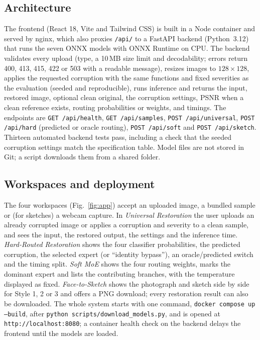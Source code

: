 \documentclass[conference]{IEEEtran}
\begin{document}
\subsection{Architecture}
The frontend (React 18, Vite and Tailwind CSS) is built in a Node container and served by nginx, which also proxies \texttt{/api/} to a FastAPI backend (Python~3.12) that runs the seven ONNX models with ONNX Runtime on CPU. The backend validates every upload (type, a 10\,MB size limit and decodability; errors return 400, 413, 415, 422 or 503 with a readable message), resizes images to $128{\times}128$, applies the requested corruption with the same functions and fixed severities as the evaluation (seeded and reproducible), runs inference and returns the input, restored image, optional clean original, the corruption settings, PSNR when a clean reference exists, routing probabilities or weights, and timings. The endpoints are \texttt{GET /api/health}, \texttt{GET /api/samples}, \texttt{POST /api/universal}, \texttt{POST /api/hard} (predicted or oracle routing), \texttt{POST /api/soft} and \texttt{POST /api/sketch}. Thirteen automated backend tests pass, including a check that the seeded corruption settings match the specification table. Model files are not stored in Git; a script downloads them from a shared folder.

\subsection{Workspaces and deployment}
The four workspaces (Fig.~\ref{fig:app}) accept an uploaded image, a bundled sample or (for sketches) a webcam capture. In \emph{Universal Restoration} the user uploads an already corrupted image or applies a corruption and severity to a clean sample, and sees the input, the restored output, the settings and the inference time. \emph{Hard-Routed Restoration} shows the four classifier probabilities, the predicted corruption, the selected expert (or ``identity bypass''), an oracle/predicted switch and the timing split. \emph{Soft MoE} shows the four routing weights, marks the dominant expert and lists the contributing branches, with the temperature displayed as fixed. \emph{Face-to-Sketch} shows the photograph and sketch side by side for Style 1, 2 or 3 and offers a PNG download; every restoration result can also be downloaded. The whole system starts with one command, \texttt{docker compose up --build}, after \texttt{python scripts/download\_models.py}, and is opened at \texttt{http://localhost:8080}; a container health check on the backend delays the frontend until the models are loaded.
\end{document}
